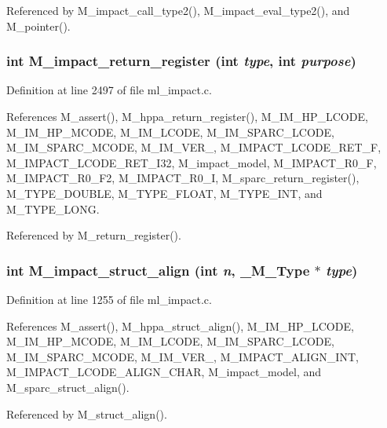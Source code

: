 Referenced by M\_\-impact\_\-call\_\-type2(), M\_\-impact\_\-eval\_\-type2(), and M\_\-pointer().
\subsubsection{\setlength{\rightskip}{0pt plus 5cm}int M\_\-impact\_\-return\_\-register (int {\em type}, int {\em purpose})}\label{ml__impact_8c_0556009b30b25e1e2083eb4d60ca0908}




Definition at line 2497 of file ml\_\-impact.c.

References M\_\-assert(), M\_\-hppa\_\-return\_\-register(), M\_\-IM\_\-HP\_\-LCODE, M\_\-IM\_\-HP\_\-MCODE, M\_\-IM\_\-LCODE, M\_\-IM\_\-SPARC\_\-LCODE, M\_\-IM\_\-SPARC\_\-MCODE, M\_\-IM\_\-VER\_, M\_\-IMPACT\_\-LCODE\_\-RET\_\-F, M\_\-IMPACT\_\-LCODE\_\-RET\_\-I32, M\_\-impact\_\-model, M\_\-IMPACT\_\-R0\_\-F, M\_\-IMPACT\_\-R0\_\-F2, M\_\-IMPACT\_\-R0\_\-I, M\_\-sparc\_\-return\_\-register(), M\_\-TYPE\_\-DOUBLE, M\_\-TYPE\_\-FLOAT, M\_\-TYPE\_\-INT, and M\_\-TYPE\_\-LONG.

Referenced by M\_\-return\_\-register().
\subsubsection{\setlength{\rightskip}{0pt plus 5cm}int M\_\-impact\_\-struct\_\-align (int {\em n}, \bf{\_\-M\_\-Type} $\ast$ {\em type})}\label{ml__impact_8c_d21888c9bce1dd53494b008eed89ca60}




Definition at line 1255 of file ml\_\-impact.c.

References M\_\-assert(), M\_\-hppa\_\-struct\_\-align(), M\_\-IM\_\-HP\_\-LCODE, M\_\-IM\_\-HP\_\-MCODE, M\_\-IM\_\-LCODE, M\_\-IM\_\-SPARC\_\-LCODE, M\_\-IM\_\-SPARC\_\-MCODE, M\_\-IM\_\-VER\_, M\_\-IMPACT\_\-ALIGN\_\-INT, M\_\-IMPACT\_\-LCODE\_\-ALIGN\_\-CHAR, M\_\-impact\_\-model, and M\_\-sparc\_\-struct\_\-align().

Referenced by M\_\-struct\_\-align().
